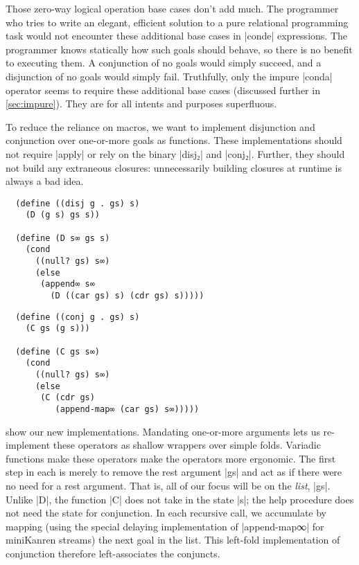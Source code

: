 \documentclass[sigplan,draft,natbib=false]{acmart}
\begin{document}
Those zero-way logical operation base cases don't add much. The
programmer who tries to write an elegant, efficient solution to a pure
relational programming task would not encounter these additional base
cases in \rackinline|conde| expressions. The programmer knows
statically how such goals should behave, so there is no benefit to
executing them. A conjunction of no goals would simply succeed, and a
disjunction of no goals would simply fail. Truthfully, only the impure
\rackinline|conda| operator seems to require these additional base
cases (discussed further in \cref{sec:impure}). They are for all
intents and purposes superfluous.

To reduce the reliance on macros, we want to implement disjunction and
conjunction over one-or-more goals as functions. These implementations
should not require \rackinline|apply| or rely on the binary
\rackinline|disj₂| and \rackinline|conj₂|. Further, they should not
build any extraneous closures: unnecessarily building closures at
runtime is always a bad idea.

\begin{listing}
  \begin{verbatim}
  (define ((disj g . gs) s)
    (D (g s) gs s))

  (define (D s∞ gs s)
    (cond
      ((null? gs) s∞)
      (else
       (append∞ s∞
         (D ((car gs) s) (cdr gs) s)))))
  \end{verbatim}
  \caption{Eventual redefinition of \rackinline|disj|}
  \label{mnt:disj-reimplementation}
\end{listing}

\begin{listing}
  \begin{verbatim}
  (define ((conj g . gs) s)
    (C gs (g s)))

  (define (C gs s∞)
    (cond
      ((null? gs) s∞)
      (else
       (C (cdr gs)
          (append-map∞ (car gs) s∞)))))
  \end{verbatim}
  \caption{Eventual redefinition of \rackinline|conj|}
  \label{mnt:conj-reimplementation}
\end{listing}

 show our
new implementations. Mandating one-or-more arguments lets us
re-implement these operators as shallow wrappers over simple folds.
Variadic functions make these operators make the operators more
ergonomic. The first step in each is merely to remove the rest
argument \rackinline|gs| and act as if there were no need for a rest
argument. That is, all of our focus will be on the \emph{list},
\rackinline|gs|. Unlike \rackinline|D|, the function \rackinline|C|
does not take in the state \rackinline|s|; the help procedure does not
need the state for conjunction. In each recursive call, we accumulate
by mapping (using the special delaying implementation of
\rackinline|append-map∞| for miniKanren streams) the next goal in the
list. This left-fold implementation of conjunction therefore
left-associates the conjuncts.
\end{document}
